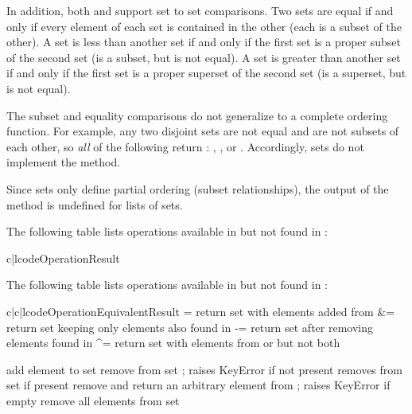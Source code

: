 In addition, both  and 
support set to set comparisons.  Two sets are equal if and only if
every element of each set is contained in the other (each is a subset
of the other).
A set is less than another set if and only if the first set is a proper
subset of the second set (is a subset, but is not equal).
A set is greater than another set if and only if the first set is a proper
superset of the second set (is a superset, but is not equal).

The subset and equality comparisons do not generalize to a complete
ordering function.  For example, any two disjoint sets are not equal and
are not subsets of each other, so \emph{all} of the following return
:  , , or
.
Accordingly, sets do not implement the  method.

Since sets only define partial ordering (subset relationships), the output
of the  method is undefined for lists of sets.

The following table lists operations available in 
but not found in :

\begin{tableii}{c|l}{code}{Operation}{Result}
\end{tableii}

The following table lists operations available in 
but not found in :

\begin{tableiii}{c|c|l}{code}{Operation}{Equivalent}{Result}
         { \textbar= }
         {return set  with elements added from }
         { \&= }
         {return set  keeping only elements also found in }
         { -= }
         {return set  after removing elements found in }
         { \textasciicircum= }
         {return set  with elements from  or 
          but not both}

  \hline
         {add element  to set }
         {remove  from set ; raises KeyError if not present}
         {removes  from set  if present}
         {remove and return an arbitrary element from ; raises
	  KeyError if empty}
         {remove all elements from set }
\end{tableiii}

